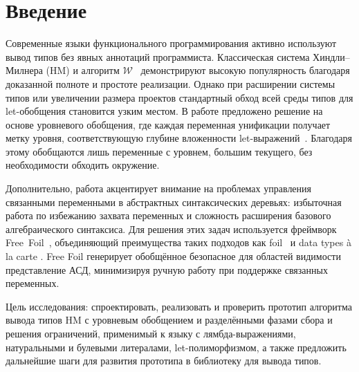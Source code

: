 \chapter{Введение}
\label{chap:intro}

Современные языки функционального программирования активно используют вывод типов без явных аннотаций программиста. Классическая система Хиндли–Милнера (HM) и алгоритм $\mathcal{W}$~\cite{Milner1978_TypePolymorphism} демонстрируют высокую популярность благодаря доказанной полноте и простоте реализации. Однако при расширении системы типов или увеличении размера проектов стандартный обход всей среды типов для let-обобщения становится узким местом. В работе предложено решение на основе уровневого обобщения, где каждая переменная унификации получает метку уровня, соответствующую глубине вложенности let-выражений~\cite{Remy1992_SortedEqTheoryTypes}. Благодаря этому обобщаются лишь переменные с уровнем, большим текущего, без необходимости обходить окружение.

Дополнительно, работа акцентирует внимание на проблемах управления связанными переменными в абстрактных синтаксических деревьях: избыточная работа по избежанию захвата переменных и сложность расширения базового алгебраического синтаксиса. Для решения этих задач используется фреймворк Free~Foil~\cite{FreeFoil}, объединяющий преимущества таких подходов как foil~\cite{Foil} и data types à la carte \cite{Swierstra2008_a_la_carte}. Free Foil генерирует обобщённое безопасное для областей видимости представление АСД, минимизируя ручную работу при поддержке связанных переменных.

Цель исследования: спроектировать, реализовать и проверить прототип алгоритма вывода типов HM с уровневым обобщением и разделёнными фазами сбора и решения ограничений, применимый к языку с лямбда-выражениями, натуральными и булевыми литералами, let-полиморфизмом, а также предложить дальнейшие шаги для развития прототипа в библиотеку для вывода типов.
